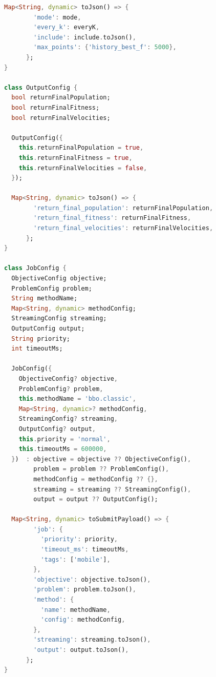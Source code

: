 \begin{lstlisting}[language=Dart, caption={Модель конфигурации эксперимента и формирование JSON-задания (mobile/lib/core/models/job\_config.dart)}, label={lst:job-config-dart}]
  Map<String, dynamic> toJson() => {
        'mode': mode,
        'every_k': everyK,
        'include': include.toJson(),
        'max_points': {'history_best_f': 5000},
      };
}

class OutputConfig {
  bool returnFinalPopulation;
  bool returnFinalFitness;
  bool returnFinalVelocities;

  OutputConfig({
    this.returnFinalPopulation = true,
    this.returnFinalFitness = true,
    this.returnFinalVelocities = false,
  });

  Map<String, dynamic> toJson() => {
        'return_final_population': returnFinalPopulation,
        'return_final_fitness': returnFinalFitness,
        'return_final_velocities': returnFinalVelocities,
      };
}

class JobConfig {
  ObjectiveConfig objective;
  ProblemConfig problem;
  String methodName;
  Map<String, dynamic> methodConfig;
  StreamingConfig streaming;
  OutputConfig output;
  String priority;
  int timeoutMs;

  JobConfig({
    ObjectiveConfig? objective,
    ProblemConfig? problem,
    this.methodName = 'bbo.classic',
    Map<String, dynamic>? methodConfig,
    StreamingConfig? streaming,
    OutputConfig? output,
    this.priority = 'normal',
    this.timeoutMs = 600000,
  })  : objective = objective ?? ObjectiveConfig(),
        problem = problem ?? ProblemConfig(),
        methodConfig = methodConfig ?? {},
        streaming = streaming ?? StreamingConfig(),
        output = output ?? OutputConfig();

  Map<String, dynamic> toSubmitPayload() => {
        'job': {
          'priority': priority,
          'timeout_ms': timeoutMs,
          'tags': ['mobile'],
        },
        'objective': objective.toJson(),
        'problem': problem.toJson(),
        'method': {
          'name': methodName,
          'config': methodConfig,
        },
        'streaming': streaming.toJson(),
        'output': output.toJson(),
      };
}
\end{lstlisting}


